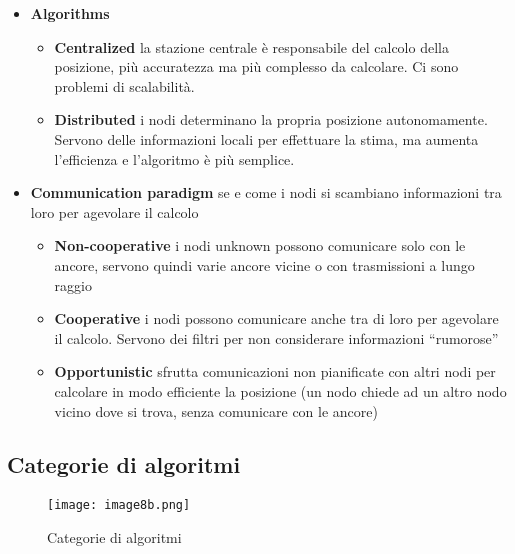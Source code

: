\begin{itemize}
\begin{itemize}
  \end{itemize}
\item \textbf{Algorithms}

  \begin{itemize}
  \item \textbf{Centralized} la stazione centrale è responsabile del calcolo
    della posizione, più accuratezza ma più complesso da calcolare. Ci
    sono problemi di scalabilità.

  \item \textbf{Distributed} i nodi determinano la propria posizione
    autonomamente. Servono delle informazioni locali per effettuare la
    stima, ma aumenta l'efficienza e l'algoritmo è più semplice.

  \end{itemize}
\item \textbf{Communication paradigm} se e come i nodi si scambiano
  informazioni tra loro per agevolare il calcolo


  \begin{itemize}
  \item \textbf{Non-cooperative} i nodi unknown possono comunicare solo con
    le ancore, servono quindi varie ancore vicine o con trasmissioni a
    lungo raggio

  \item \textbf{Cooperative} i nodi possono comunicare anche tra di loro per
    agevolare il calcolo. Servono dei filtri per non considerare
    informazioni ``rumorose''

  \item \textbf{Opportunistic} sfrutta comunicazioni non pianificate con
    altri nodi per calcolare in modo efficiente la posizione (un nodo
    chiede ad un altro nodo vicino dove si trova, senza comunicare con
    le ancore)
  \end{itemize}
\end{itemize}

\subsection[Categorie di algoritmi] {Categorie di algoritmi}


\begin{figure}[H]
 \centering
 \texttt{[image: image8b.png]}
 \caption{Categorie di algoritmi}
 \label{categorie-di-algoritmi}
\end{figure}

